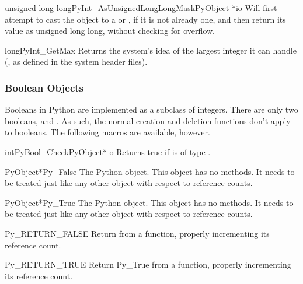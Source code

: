 \begin{cfuncdesc}{unsigned long long}{PyInt_AsUnsignedLongLongMask}{PyObject *io}
  Will first attempt to cast the object to a  or
  , if it is not already one, and then return its
  value as unsigned long long, without checking for overflow.
\end{cfuncdesc}

\begin{cfuncdesc}{long}{PyInt_GetMax}{}
  Returns the system's idea of the largest integer it can handle
  (, as defined in the system
  header files).
\end{cfuncdesc}

\subsubsection{Boolean Objects \label{boolObjects}}

Booleans in Python are implemented as a subclass of integers.  There
are only two booleans,  and .  As
such, the normal creation and deletion functions don't apply to
booleans.  The following macros are available, however.

\begin{cfuncdesc}{int}{PyBool_Check}{PyObject* o}
  Returns true if  is of type .
\end{cfuncdesc}

\begin{cvardesc}{PyObject*}{Py_False}
  The Python  object.  This object has no methods.  It needs to
  be treated just like any other object with respect to reference counts.
\end{cvardesc}

\begin{cvardesc}{PyObject*}{Py_True}
  The Python  object.  This object has no methods.  It needs to
  be treated just like any other object with respect to reference counts.
\end{cvardesc}

\begin{csimplemacrodesc}{Py_RETURN_FALSE}
  Return  from a function, properly incrementing its
  reference count.
\end{csimplemacrodesc}

\begin{csimplemacrodesc}{Py_RETURN_TRUE}
Return Py_True from a function, properly incrementing its reference
count.
\end{csimplemacrodesc}

